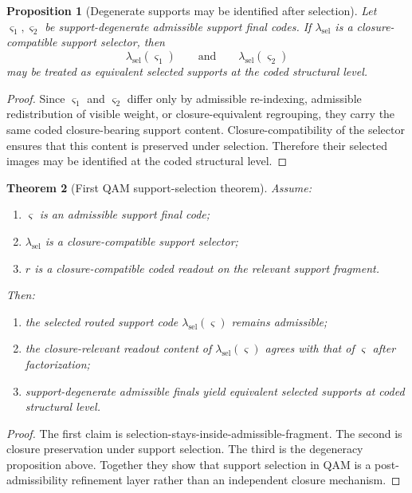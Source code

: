 \documentclass[12pt,a4paper]{article}
\newtheorem{theorem}{Theorem}[section]
\newtheorem{proposition}[theorem]{Proposition}
\begin{document}
\begin{proposition}[Degenerate supports may be identified after selection]
Let $\varsigma_1,\varsigma_2$ be support-degenerate admissible support final codes. If $\lambda_{\mathrm{sel}}$ is a closure-compatible support selector, then
\[
\lambda_{\mathrm{sel}}(\varsigma_1)
\qquad\text{and}\qquad
\lambda_{\mathrm{sel}}(\varsigma_2)
\]
may be treated as equivalent selected supports at the coded structural level.
\end{proposition}

\begin{proof}
Since $\varsigma_1$ and $\varsigma_2$ differ only by admissible re-indexing, admissible redistribution of visible weight, or closure-equivalent regrouping, they carry the same coded closure-bearing support content. Closure-compatibility of the selector ensures that this content is preserved under selection. Therefore their selected images may be identified at the coded structural level.
\end{proof}

\begin{theorem}[First QAM support-selection theorem]
Assume:
\begin{enumerate}
\item $\varsigma$ is an admissible support final code;
\item $\lambda_{\mathrm{sel}}$ is a closure-compatible support selector;
\item $r$ is a closure-compatible coded readout on the relevant support fragment.
\end{enumerate}
Then:
\begin{enumerate}
\item the selected routed support code $\lambda_{\mathrm{sel}}(\varsigma)$ remains admissible;
\item the closure-relevant readout content of $\lambda_{\mathrm{sel}}(\varsigma)$ agrees with that of $\varsigma$ after factorization;
\item support-degenerate admissible finals yield equivalent selected supports at coded structural level.
\end{enumerate}
\end{theorem}

\begin{proof}
The first claim is selection-stays-inside-admissible-fragment. The second is closure preservation under support selection. The third is the degeneracy proposition above. Together they show that support selection in QAM is a post-admissibility refinement layer rather than an independent closure mechanism.
\end{proof}
\end{document}
